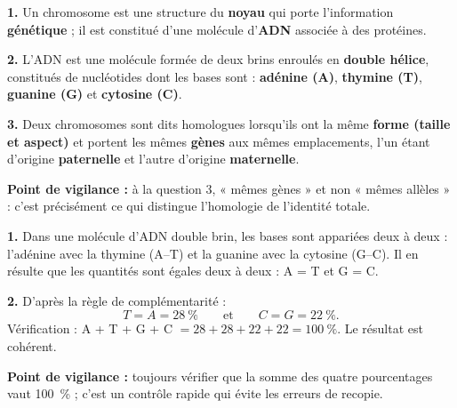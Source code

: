 \documentclass[11pt]{article}
\begin{document}
\begin{corrige}
\textbf{1.} Un chromosome est une structure du \textbf{noyau} qui porte l'information \textbf{génétique} ; il est constitué d'une molécule d'\textbf{ADN} associée à des protéines.

\textbf{2.} L'ADN est une molécule formée de deux brins enroulés en \textbf{double hélice}, constitués de nucléotides dont les bases sont : \textbf{adénine (A)}, \textbf{thymine (T)}, \textbf{guanine (G)} et \textbf{cytosine (C)}.

\textbf{3.} Deux chromosomes sont dits homologues lorsqu'ils ont la même \textbf{forme (taille et aspect)} et portent les mêmes \textbf{gènes} aux mêmes emplacements, l'un étant d'origine \textbf{paternelle} et l'autre d'origine \textbf{maternelle}.

\textbf{Point de vigilance :} à la question 3, « mêmes gènes » et non « mêmes allèles » : c'est précisément ce qui distingue l'homologie de l'identité totale.
\end{corrige}

\begin{corrige}
\textbf{1.} Dans une molécule d'ADN double brin, les bases sont appariées deux à deux : l'adénine avec la thymine (A--T) et la guanine avec la cytosine (G--C). Il en résulte que les quantités sont égales deux à deux : A = T et G = C.

\textbf{2.} D'après la règle de complémentarité :
\[ T = A = \SI{28}{\%} \qquad \text{et} \qquad C = G = \SI{22}{\%}. \]
Vérification : A + T + G + C $= 28 + 28 + 22 + 22 = \SI{100}{\%}$. Le résultat est cohérent.

\textbf{Point de vigilance :} toujours vérifier que la somme des quatre pourcentages vaut \SI{100}{\%} ; c'est un contrôle rapide qui évite les erreurs de recopie.
\end{corrige}
\end{document}
